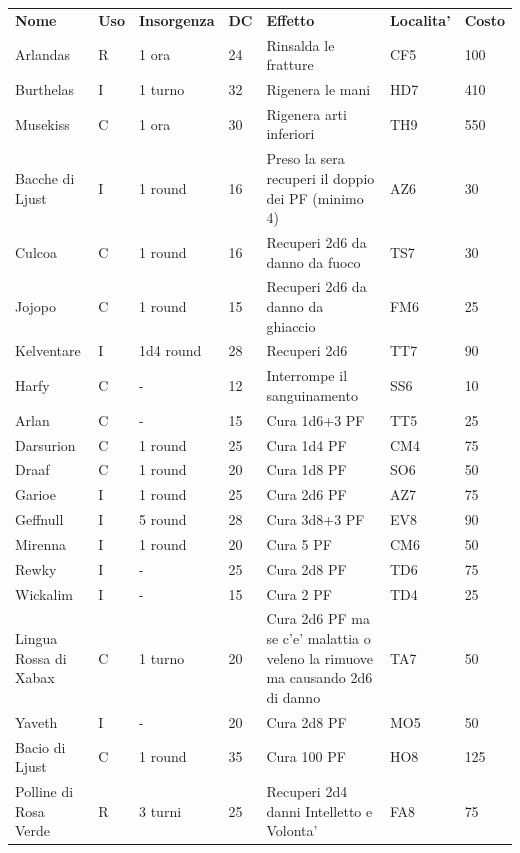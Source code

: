 \documentclass[a4paper,11pt,twoside,openany]{book}
\begin{document}
{\begin{longtable}{|L{3.2cm} |k{0.7cm} |k{1.7cm}| D{1cm} |L{5cm} |k{1.5cm} |k{1cm}|}
	\textbf{Nome} & \textbf{Uso} & \textbf{Insorgenza} & \textbf{DC} & \textbf{Effetto} & \textbf{Localita'} & \textbf{Costo}\\
Arlandas & R & 1 ora & 24 & Rinsalda le fratture & CF5 & 100\\
Burthelas  & I & 1 turno & 32 & Rigenera le mani & HD7 & 410\\
Musekiss& C & 1 ora & 30 & Rigenera arti inferiori & TH9 & 550\\
Bacche di Ljust  & I & 1 round & 16 & Preso la sera recuperi il doppio dei PF (minimo 4)& AZ6 & 30\\
Culcoa& C & 1 round & 16 & Recuperi 2d6 da danno da fuoco & TS7 & 30\\
Jojopo & C & 1 round & 15 & Recuperi 2d6 da danno da ghiaccio & FM6 & 25\\
Kelventare & I & 1d4 round & 28 & Recuperi 2d6 & TT7 & 90\\
Harfy  & C & - & 12 & Interrompe il sanguinamento & SS6 & 10\\
Arlan & C & - & 15 & Cura 1d6+3 PF & TT5 & 25\\
Darsurion & C & 1 round & 25 & Cura 1d4 PF & CM4 & 75\\
Draaf  & C & 1 round & 20 & Cura 1d8 PF & SO6 & 50\\
Garioe & I & 1 round & 25 & Cura 2d6 PF & AZ7 & 75\\
Geffnull & I & 5 round & 28 & Cura 3d8+3 PF & EV8 & 90\\
Mirenna & I & 1 round & 20 & Cura 5 PF & CM6 & 50\\
Rewky & I & - & 25 & Cura 2d8 PF & TD6 & 75\\
Wickalim & I & - & 15 & Cura 2 PF & TD4 & 25\\
Lingua Rossa di Xabax& C & 1 turno & 20 & Cura 2d6 PF ma se c'e' malattia o veleno la rimuove ma causando 2d6 di danno& TA7 & 50\\
Yaveth & I & - & 20 & Cura 2d8 PF & MO5 & 50\\
Bacio di Ljust & C & 1 round & 35 & Cura 100 PF & HO8 & 125\\
Polline di Rosa Verde & R & 3 turni & 25 & Recuperi 2d4 danni Intelletto e Volonta' & FA8 & 75\\

\end{longtable}}
\end{document}
